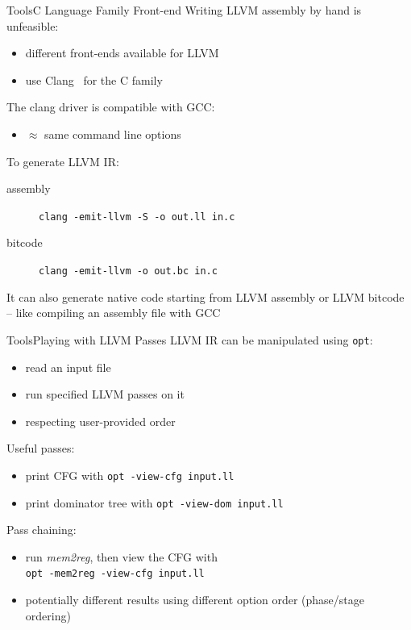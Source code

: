 \documentclass[10pt,mathserif]{beamer}
\begin{document}
\begin{frame}{Tools}{C Language Family Front-end}
	Writing LLVM assembly by hand is unfeasible:
	
	\begin{itemize}
		\item different front-ends available for LLVM
		\item use Clang~\cite{LOCAL:www/clang} for the C family
	\end{itemize}
	The clang driver is compatible with GCC:
	\begin{itemize}
		\item $\approx$ same command line options
	\end{itemize}
	\vfill
	To generate LLVM IR:
	\begin{description}
		\item[assembly] \texttt{\smaller clang -emit-llvm -S -o out.ll in.c}
		\item[bitcode] \texttt{\smaller  clang -emit-llvm -o out.bc in.c}
	\end{description}
	
	It can also generate native code starting from LLVM assembly or LLVM bitcode --
	like compiling an assembly file with GCC
\end{frame}

\begin{frame}{Tools}{Playing with LLVM Passes}
	LLVM IR can be manipulated using \texttt{\smaller opt}:
	
	\begin{itemize}
		\item read an input file
		\item run specified LLVM passes on it
		\item respecting user-provided order
	\end{itemize}
	\vfill
	Useful passes:
	\begin{itemize}
		\item print CFG with \texttt{\smaller opt -view-cfg input.ll}
		\item print dominator tree with \texttt{\smaller opt -view-dom input.ll}
	\end{itemize}
	\vfill
	Pass chaining:
	\begin{itemize}
		\item run \emph{mem2reg}, then view the CFG with \\
		\texttt{\smaller opt -mem2reg -view-cfg input.ll}
		\item potentially different results using different option order (\alert{phase/stage ordering})
	\end{itemize}
\end{frame}
\end{document}

